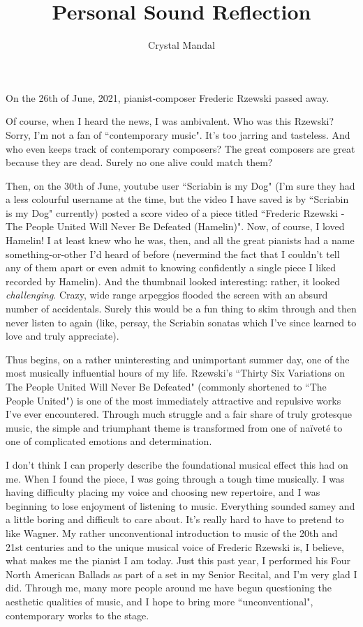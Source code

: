 \documentclass[14pt, letterpaper]{article}
\title{ \vspace*{-72pt} Personal Sound Reflection }
\author{Crystal Mandal}
\date{}
\begin{document}
\maketitle

On the 26th of June, 2021, pianist-composer Frederic Rzewski passed away. 

Of course, when I heard the news, I was ambivalent. Who was this Rzewski? 
Sorry, I'm not a fan of ``contemporary music". It's too jarring and tasteless. 
And who even keeps track of contemporary composers? The great composers are 
great because they are dead. Surely no one alive could match them?

Then, on the 30th of June, youtube user ``Scriabin is my Dog" (I'm sure they 
had a less colourful username at the time, but the video I have saved is by 
``Scriabin is my Dog" currently) posted a score video of a piece titled ``Frederic Rzewski - The People United Will Never Be Defeated (Hamelin)". Now, of course, 
I loved Hamelin! I at least knew who he was, then, and all the great pianists 
had a name something-or-other I'd heard of before (nevermind the fact that 
I couldn't tell any of them apart or even admit to knowing confidently a single 
piece I liked recorded by Hamelin). And the thumbnail looked interesting: 
rather, it looked \textit{challenging}. Crazy, wide range arpeggios flooded 
the screen with an absurd number of accidentals. Surely this would be a fun thing 
to skim through and then never listen to again (like, persay, the Scriabin sonatas 
which I've since learned to love and truly appreciate). 

Thus begins, on a rather uninteresting and unimportant summer day, one of the 
most musically influential hours of my life. Rzewski's ``Thirty Six Variations 
on The People United Will Never Be Defeated" (commonly shortened to ``The People 
United") is one of the most immediately attractive and repulsive works I've ever 
encountered. Through much struggle and a fair share of truly grotesque music, the 
simple and triumphant theme is transformed from one of naïveté to one of complicated 
emotions and determination. 

I don't think I can properly describe the foundational musical effect this had 
on me. When I found the piece, I was going through a tough time musically. I was 
having difficulty placing my voice and choosing new repertoire, and I was 
beginning to lose enjoyment of listening to music. Everything sounded samey and 
a little boring and difficult to care about. It's really hard to have to pretend  
to like Wagner. My rather unconventional introduction to music of the 20th 
and 21st centuries and to the unique musical voice of Frederic Rzewski is, I 
believe, what makes me the pianist I am today. Just this past year, I performed 
his Four North American Ballads as part of a set in my Senior Recital, and I'm 
very glad I did. Through me, many more people around me have begun questioning 
the aesthetic qualities of music, and I hope to bring more ``unconventional", 
contemporary works to the stage.
\end{document}
